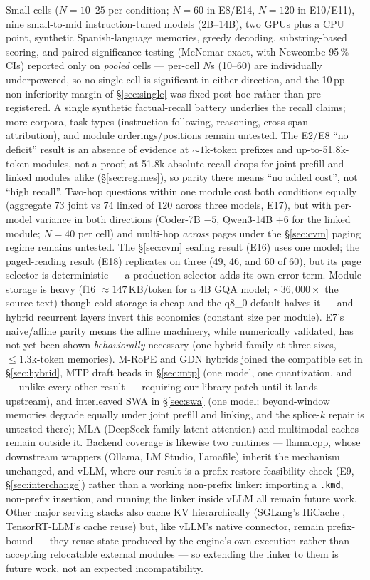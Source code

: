 \documentclass[11pt]{article}
\newcommand{\code}[1]{\texttt{#1}}
\begin{document}
Small cells ($N{=}10$--$25$ per condition; $N{=}60$ in E8/E14, $N{=}120$ in E10/E11), nine small-to-mid instruction-tuned models (2B--14B), two GPUs plus a CPU point, synthetic Spanish-language memories, greedy decoding, substring-based scoring, and paired significance testing (McNemar exact, with Newcombe 95\,\% CIs) reported only on \emph{pooled} cells --- per-cell $N$s (10--60) are individually underpowered, so no single cell is significant in either direction, and the 10\,pp non-inferiority margin of \S\ref{sec:single} was fixed post hoc rather than pre-registered. A single synthetic factual-recall battery underlies the recall claims; more corpora, task types (instruction-following, reasoning, cross-span attribution), and module orderings/positions remain untested. The E2/E8 ``no deficit'' result is an absence of evidence at ${\sim}1$k-token prefixes and up-to-51.8k-token modules, not a proof; at 51.8k absolute recall drops for joint prefill and linked modules alike (\S\ref{sec:regimes}), so parity there means ``no added cost'', not ``high recall''. Two-hop questions within one module cost both conditions equally (aggregate 73 joint vs 74 linked of 120 across three models, E17), but with per-model variance in both directions (Coder-7B $-5$, Qwen3-14B $+6$ for the linked module; $N{=}40$ per cell) and multi-hop \emph{across} pages under the \S\ref{sec:cvm} paging regime remains untested. The \S\ref{sec:cvm} sealing result (E16) uses one model; the paged-reading result (E18) replicates on three (49, 46, and 60 of 60), but its page selector is deterministic --- a production selector adds its own error term. Module storage is heavy (f16 $\approx 147$\,KB/token for a 4B GQA model; ${\sim}36{,}000\times$ the source text) though cold storage is cheap and the q8\_0 default halves it --- and hybrid recurrent layers invert this economics (constant size per module). E7's naive/affine parity means the affine machinery, while numerically validated, has not yet been shown \emph{behaviorally} necessary (one hybrid family at three sizes, $\leq 1.3$k-token memories). M-RoPE and GDN hybrids joined the compatible set in \S\ref{sec:hybrid}, MTP draft heads in \S\ref{sec:mtp} (one model, one quantization, and --- unlike every other result --- requiring our library patch until it lands upstream), and interleaved SWA in \S\ref{sec:swa} (one model; beyond-window memories degrade equally under joint prefill and linking, and the splice-$k$ repair is untested there); MLA (DeepSeek-family latent attention) and multimodal caches remain outside it. Backend coverage is likewise two runtimes --- llama.cpp, whose downstream wrappers (Ollama, LM Studio, llamafile) inherit the mechanism unchanged, and vLLM, where our result is a prefix-restore feasibility check (E9, \S\ref{sec:interchange}) rather than a working non-prefix linker: importing a \code{.kmd}, non-prefix insertion, and running the linker inside vLLM all remain future work. Other major serving stacks also cache KV hierarchically (SGLang's HiCache \citep{zheng2024}, TensorRT-LLM's cache reuse) but, like vLLM's native connector, remain prefix-bound --- they reuse state produced by the engine's own execution rather than accepting relocatable external modules --- so extending the linker to them is future work, not an expected incompatibility.
\end{document}
